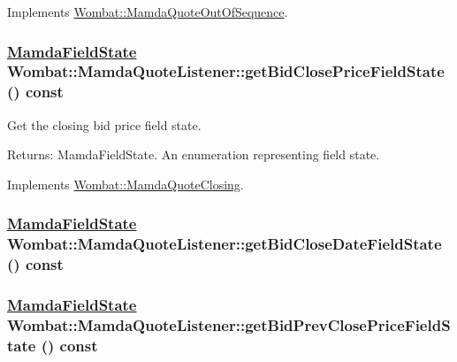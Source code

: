 Implements \hyperlink{classWombat_1_1MamdaQuoteOutOfSequence_f98691d7c7a4d1234474a849fbc15c36}{Wombat::Mamda\-Quote\-Out\-Of\-Sequence}.\hypertarget{classWombat_1_1MamdaQuoteListener_168cfd897d5c3f532d49e36c0e380db3}{
\subsubsection[getBidClosePriceFieldState]{\setlength{\rightskip}{0pt plus 5cm}\hyperlink{namespaceWombat_93aac974f2ab713554fd12a1fa3b7d2a}{Mamda\-Field\-State} Wombat::Mamda\-Quote\-Listener::get\-Bid\-Close\-Price\-Field\-State () const}}
\label{classWombat_1_1MamdaQuoteListener_168cfd897d5c3f532d49e36c0e380db3}


Get the closing bid price field state. 

\begin{Desc}
\item[Returns:]Mamda\-Field\-State. An enumeration representing field state. \end{Desc}


Implements \hyperlink{classWombat_1_1MamdaQuoteClosing_b9a5522238b0f2c1d64a7192b28d4644}{Wombat::Mamda\-Quote\-Closing}.\hypertarget{classWombat_1_1MamdaQuoteListener_a61f3b17ec3755be6696abb38db5d65e}{
\subsubsection[getBidCloseDateFieldState]{\setlength{\rightskip}{0pt plus 5cm}\hyperlink{namespaceWombat_93aac974f2ab713554fd12a1fa3b7d2a}{Mamda\-Field\-State} Wombat::Mamda\-Quote\-Listener::get\-Bid\-Close\-Date\-Field\-State () const}}
\label{classWombat_1_1MamdaQuoteListener_a61f3b17ec3755be6696abb38db5d65e}


\hypertarget{classWombat_1_1MamdaQuoteListener_71d4b27da209e537018ed78be16b9b35}{
\subsubsection[getBidPrevClosePriceFieldState]{\setlength{\rightskip}{0pt plus 5cm}\hyperlink{namespaceWombat_93aac974f2ab713554fd12a1fa3b7d2a}{Mamda\-Field\-State} Wombat::Mamda\-Quote\-Listener::get\-Bid\-Prev\-Close\-Price\-Field\-State () const}}
\label{classWombat_1_1MamdaQuoteListener_71d4b27da209e537018ed78be16b9b35}


